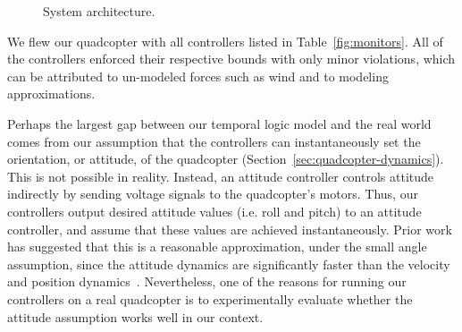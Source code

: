 \begin{figure}[t]
  \centering

     \caption{System architecture.}
     \label{fig:arch}
\end{figure}

We flew our quadcopter with all controllers listed in
Table~\ref{fig:monitors}.  All of the controllers enforced their
respective bounds with only minor violations, which can be attributed to
un-modeled forces such as wind and to modeling approximations.

Perhaps the largest gap between our temporal logic model and the real world
comes from our assumption that the controllers can instantaneously set the
orientation, or attitude, of the quadcopter
(Section~\ref{sec:quadcopter-dynamics}).  This is not possible in reality.
Instead, an attitude controller controls attitude indirectly by sending
voltage signals to the quadcopter's motors.  Thus, our controllers output
desired attitude values (i.e. roll and pitch) to an attitude controller,
and assume that these values are achieved instantaneously.  Prior work has
suggested that this is a reasonable approximation, under the small angle
assumption, since the attitude dynamics are significantly faster than the
velocity and position dynamics~\cite{Gillula2011}.  Nevertheless, one of
the reasons for running our controllers on a real quadcopter is to
experimentally evaluate whether the attitude assumption works well in our
context.

